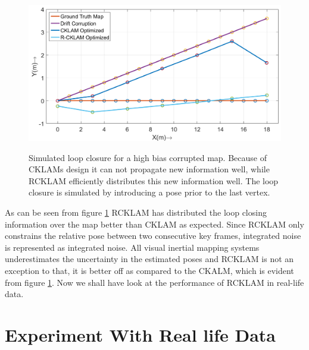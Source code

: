 \begin{figure}[ht]
  \centering
    \includegraphics[width=1.00\textwidth]{images/Syn16_map_loppClosureSym.png}
  \label{fig:Syn16MapLoppClosureSym}
  \caption{Simulated loop closure for a high bias corrupted map. Because of CKLAMs design it can not propagate new information well, while RCKLAM efficiently distributes this new information well. The loop closure is simulated by introducing a pose prior to the last vertex.}
\end{figure}

As can be seen from figure \ref{fig:Syn16MapLoppClosureSym} RCKLAM has distributed the loop closing information over the map better than CKLAM as expected. Since RCKLAM only constrains the relative pose between two consecutive key frames, integrated noise is represented as integrated noise. All visual inertial mapping systems underestimates the uncertainty in the estimated poses and RCKLAM is not an exception to that, it is better off as compared to the CKALM, which is evident from figure \ref{fig:Syn16MapLoppClosureSym}. Now we shall have look at the performance of RCKLAM in real-life data.

\section{Experiment With Real life Data}
\label{sec:RealLifeExpt}

